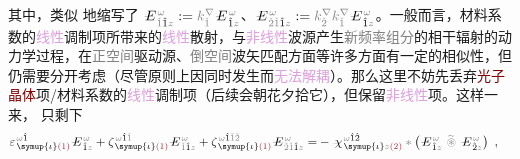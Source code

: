 其中，类似  地缩写了 $\xint{\mathcolor{gray}{-}}{25}{E}^{\;\!\mathcolor{gray}{\omega}}_{\;\! \mathcolor{gray}{\check{1}} \hat{1} \mathcolor{gray}{z}} := \mathcolor{gray}{k^\nabla_{\check{1}}} \xint{\mathcolor{gray}{-}}{25}{E}^{\;\!\mathcolor{gray}{\omega}}_{\;\! \hat{1} \mathcolor{gray}{z}}$、$\xint{\mathcolor{gray}{-}}{25}{E}^{\;\!\mathcolor{gray}{\omega}}_{\;\! \mathcolor{gray}{\check{2} \check{1}} \hat{1} \mathcolor{gray}{z}} := \mathcolor{gray}{k^\nabla_{\check{2}}} \mathcolor{gray}{k^\nabla_{\check{1}}} \xint{\mathcolor{gray}{-}}{25}{E}^{\;\!\mathcolor{gray}{\omega}}_{\;\! \hat{1} \mathcolor{gray}{z}}$。一般而言，材料系数的\textcolor{Plum}{线性}调制项所带来的\textcolor{Plum}{线性}散射，与\textcolor{Plum}{非线性}\textcolor{NavyBlue}{波源}产生\textcolor{gray}{新频率组分}的相干辐射的动力学过程，在\textcolor{gray}{正空间}\textcolor{NavyBlue}{驱动源}、\textcolor{gray}{倒空间}\textcolor{PineGreen}{波矢}匹配方面等许多方面有一定的相似性\cite{gerkeAperiodicVolumeOptics2010,chenQuasiphasematchingdivisionMultiplexingHolography2021b}，但仍需要分开考虑（尽管原则上因同时发生而\textcolor{Plum}{无法解耦}）。那么这里不妨先丢弃\textcolor{Maroon}{光子晶体}项/材料系数的\textcolor{Plum}{线性}调制项（后续会朝花夕拾它），但保留\textcolor{Plum}{非线性}项。这样一来， 只剩下
\begin{align} \label{eq:nonlinear(2)-wave_wkrho-simplify5}
	\varepsilon^{\;\! \mathcolor{gray}{\omega} \hat{1}}_{\;\! \symup{\iota} \textcolor{Maroon}{(1)}} \xint{\mathcolor{gray}{-}}{295}{E}^{\;\!\mathcolor{gray}{\omega}}_{\;\! \hat{1} \mathcolor{gray}{z}} + \zeta^{\;\! \mathcolor{gray}{\omega} \hat{1} \mathcolor{gray}{\check{1}}}_{\;\! \symup{\iota} \textcolor{Maroon}{(1)}} \xint{\mathcolor{gray}{-}}{295}{E}^{\;\!\mathcolor{gray}{\omega}}_{\;\! \mathcolor{gray}{\check{1}} \hat{1} \mathcolor{gray}{z}} + \zeta^{\;\! \mathcolor{gray}{\omega} \hat{1} \mathcolor{gray}{\check{1} \check{2}}}_{\;\! \symup{\iota} \textcolor{Maroon}{(1)}} \xint{\mathcolor{gray}{-}}{295}{E}^{\;\!\mathcolor{gray}{\omega}}_{\;\! \mathcolor{gray}{\check{2} \check{1}} \hat{1} \mathcolor{gray}{z}}
	= &- \xint{{}^{}_{\mathcolor{gray}{-}}}{23}{\chi}^{\;\! \mathcolor{gray}{\omega} \hat{1} \hat{2}}_{\;\! \symup{\iota} \mathcolor{gray}{z} \textcolor{Maroon}{(2)}} \mathcolor{gray}{*} \left( \xint{\mathcolor{gray}{-}}{295}{E}^{\;\!\mathcolor{gray}{\omega}}_{\;\! \hat{1} \mathcolor{gray}{z}} ~\mathcolor{gray}{\widetilde \circledast}~ \xint{\mathcolor{gray}{-}}{295}{E}^{\;\!\mathcolor{gray}{\omega}}_{\;\! \hat{2} \mathcolor{gray}{z}} \right) ~,
\end{align}
